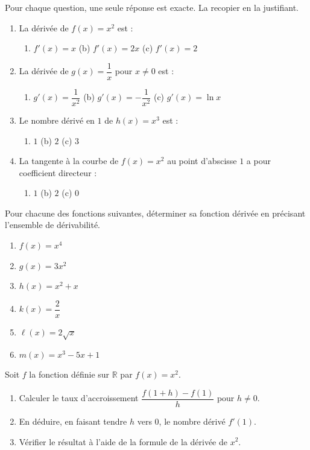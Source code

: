\documentclass[11pt]{article}
\begin{document}
\begin{exercice}[QCM]
Pour chaque question, une seule réponse est exacte. La recopier en la justifiant.
\begin{enumerate}
\item La dérivée de $f(x)=x^2$ est :
\begin{enumerate}
\item[(a)] $f'(x)=x$ \quad (b) $f'(x)=2x$ \quad (c) $f'(x)=2$
\end{enumerate}
\item La dérivée de $g(x)=\dfrac{1}{x}$ pour $x\neq 0$ est :
\begin{enumerate}
\item[(a)] $g'(x)=\dfrac{1}{x^2}$ \quad (b) $g'(x)=-\dfrac{1}{x^2}$ \quad (c) $g'(x)=\ln x$
\end{enumerate}
\item Le nombre dérivé en $1$ de $h(x)=x^3$ est :
\begin{enumerate}
\item[(a)] $1$ \quad (b) $2$ \quad (c) $3$
\end{enumerate}
\item La tangente à la courbe de $f(x)=x^2$ au point d'abscisse $1$ a pour coefficient directeur :
\begin{enumerate}
\item[(a)] $1$ \quad (b) $2$ \quad (c) $0$
\end{enumerate}
\end{enumerate}
\end{exercice}

\begin{exercice}
Pour chacune des fonctions suivantes, déterminer sa fonction dérivée en précisant l'ensemble de dérivabilité.
\begin{enumerate}
\item $f(x)=x^4$
\item $g(x)=3x^2$
\item $h(x)=x^2+x$
\item $k(x)=\dfrac{2}{x}$
\item $\ell(x)=2\sqrt{x}$
\item $m(x)=x^3-5x+1$
\end{enumerate}
\end{exercice}

\begin{exercice}
Soit $f$ la fonction définie sur $\mathbb{R}$ par $f(x)=x^2$.
\begin{enumerate}
\item Calculer le taux d'accroissement $\dfrac{f(1+h)-f(1)}{h}$ pour $h\neq 0$.
\item En déduire, en faisant tendre $h$ vers $0$, le nombre dérivé $f'(1)$.
\item Vérifier le résultat à l'aide de la formule de la dérivée de $x^2$.
\end{enumerate}
\end{exercice}
\end{document}
